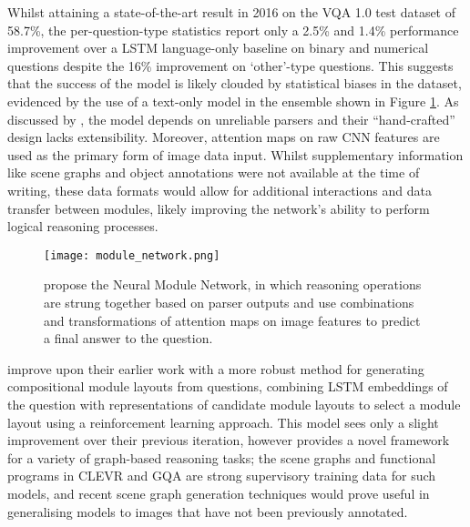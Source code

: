 \vspace{\baselineskip}

Whilst attaining a state-of-the-art result in 2016 on the VQA 1.0 test dataset \cite{antol2015vqa} of 58.7\%, the per-question-type statistics report only a 2.5\% and 1.4\% performance improvement over a LSTM language-only baseline on binary and numerical questions despite the 16\% improvement on `other'-type questions. This suggests that the success of the model is likely clouded by statistical biases in the dataset, evidenced by the use of a text-only model in the ensemble shown in Figure \ref{fig:andreas2016neural_neural_module_network}. As discussed by \citeauthor{hudson2018compositional}, the model depends on unreliable parsers and their ``hand-crafted'' design lacks extensibility. Moreover, attention maps on raw CNN features are used as the primary form of image data input. Whilst supplementary information like scene graphs and object annotations were not available at the time of writing, these data formats would allow for additional interactions and data transfer between modules, likely improving the network's ability to perform logical reasoning processes.

\begin{figure}[H]
    \centering
    \texttt{[image: module\_network.png]}
    \caption{\citeauthor{andreas2016neural} propose the Neural Module Network, in which reasoning operations are strung together based on parser outputs and use combinations and transformations of attention maps on image features to predict a final answer to the question.}
    \label{fig:andreas2016neural_neural_module_network}
\end{figure}

\citeauthor{andreas2016learning} improve upon their earlier work with a more robust method for generating compositional module layouts from questions, combining LSTM embeddings of the question with representations of candidate module layouts to select a module layout using a reinforcement learning approach. This model sees only a slight improvement over their previous iteration, however provides a novel framework for a variety of graph-based reasoning tasks; the scene graphs and functional programs in CLEVR and GQA are strong supervisory training data for such models, and recent scene graph generation techniques \cite{yang2018graph} would prove useful in generalising models to images that have not been previously annotated.


